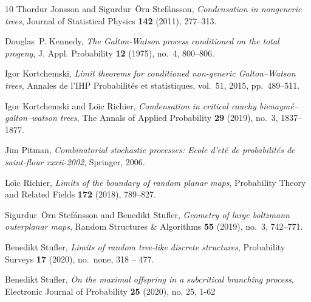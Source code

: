 \documentclass[a4paper,11pt]{article}
\begin{document}
\begin{thebibliography}{10}
Thordur Jonsson and Sigurdur~{\"O}rn Stef{\'a}nsson, \emph{Condensation in
  nongeneric trees}, Journal of Statistical Physics \textbf{142} (2011),
  277--313.

Douglas~P. Kennedy, \emph{The {G}alton-{W}atson process conditioned on the
  total progeny}, J. Appl. Probability \textbf{12} (1975), no.~4, 800--806.

Igor Kortchemski, \emph{Limit theorems for conditioned non-generic
  {G}alton--{W}atson trees}, Annales de l'IHP Probabilit{\'e}s et statistiques,
  vol.~51, 2015, pp.~489--511.

Igor Kortchemski and Lo{\"\i}c Richier, \emph{Condensation in critical cauchy
  bienaym{\'e}--galton--watson trees}, The Annals of Applied Probability
  \textbf{29} (2019), no.~3, 1837--1877.

Jim Pitman, \emph{Combinatorial stochastic processes: Ecole d'et{\'e} de
  probabilit{\'e}s de saint-flour xxxii-2002}, Springer, 2006.

Lo{\"\i}c Richier, \emph{Limits of the boundary of random planar maps},
  Probability Theory and Related Fields \textbf{172} (2018), 789--827.

Sigurdur~{\"O}rn Stef{\'a}nsson and Benedikt Stufler, \emph{Geometry of large
  boltzmann outerplanar maps}, Random Structures \& Algorithms \textbf{55}
  (2019), no.~3, 742--771.

Benedikt Stufler, \emph{{Limits of random tree-like discrete structures}},
  Probability Surveys \textbf{17} (2020), no.~none, 318 -- 477.

Benedikt Stufler, \emph{On the maximal offspring in a subcritical branching process}, Electronic Journal of Probability \textbf{25} (2020), no. 25, 1-62

\end{thebibliography}
\end{document}
